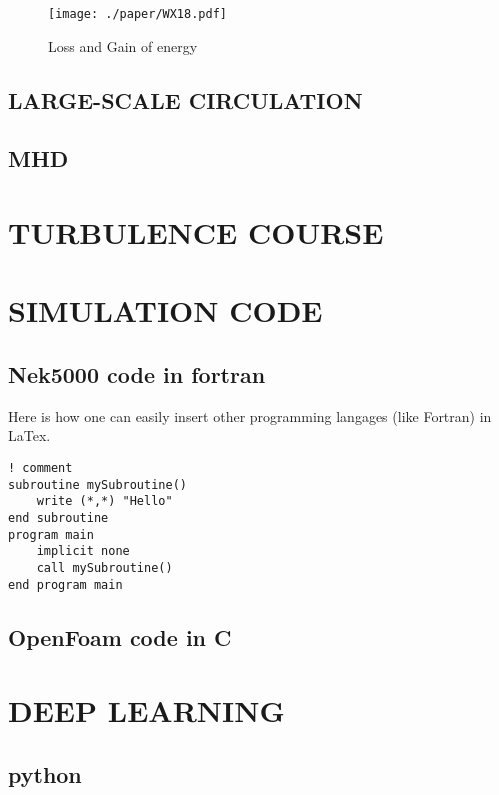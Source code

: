 \documentclass{hmj}
\begin{document}
\begin{figure}
  \centering
  \centering
  \texttt{[image: ./paper/WX18.pdf]}
  \renewcommand{\figurename}{Figure}
  \caption{Loss and Gain of energy}
  \renewcommand{\figurename}{图}
\label{fig3}
\end{figure}

\subsection{LARGE-SCALE CIRCULATION}

\subsection{MHD}

\section{TURBULENCE COURSE}

\section{SIMULATION CODE}
\subsection{Nek5000 code in fortran}

Here is how one can easily insert other programming langages (like Fortran) in LaTex.
\begin{tcolorbox}[colback=black!5!white,colframe=white]
\begin{lstlisting}[frame=lrtb]
! comment
subroutine mySubroutine()
    write (*,*) "Hello"
end subroutine
program main
    implicit none
    call mySubroutine()
end program main
\end{lstlisting}
 \end{tcolorbox}

\subsection{OpenFoam code in C}


\section{DEEP LEARNING}

\subsection{python}
\end{document}
